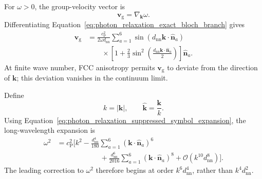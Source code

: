 For \(\omega>0\), the group-velocity vector is
\begin{equation}
    \mathbf v_{\mathrm g}
    =
    \nabla_{\mathbf k}\omega.
    \label{eq:photon_relaxation_group_velocity_definition}
\end{equation}
Differentiating
Equation~\eqref{eq:photon_relaxation_exact_bloch_branch} gives
\begin{align}
    \mathbf v_{\mathrm g}
    &=
    \frac{
        c_{\mathrm P}^2
    }{
        2\omega d_{\mathrm{nn}}
    }
    \sum_{a=1}^{6}
    \sin
    \left(
        d_{\mathrm{nn}}
        \mathbf k\cdot
        \widehat{\mathbf n}_a
    \right)
    \nonumber\\
    &\qquad\times
    \left[
        1
        +
        \frac{2}{3}
        \sin^2
        \left(
            \frac{
                d_{\mathrm{nn}}
                \mathbf k\cdot
                \widehat{\mathbf n}_a
            }{
                2
            }
        \right)
    \right]
    \widehat{\mathbf n}_a.
    \label{eq:photon_relaxation_exact_group_velocity_vector}
\end{align}
At finite wave number, FCC anisotropy permits
\(\mathbf v_{\mathrm g}\) to deviate from the direction of
\(\mathbf k\); this deviation vanishes in the continuum limit.

Define
\begin{equation}
    k
    =
    \left|
        \mathbf k
    \right|,
    \qquad
    \widehat{\mathbf k}
    =
    \frac{
        \mathbf k
    }{
        k
    }.
    \label{eq:photon_relaxation_wavevector_direction}
\end{equation}
Using
Equation~\eqref{eq:photon_relaxation_suppressed_symbol_expansion}, the
long-wavelength expansion is
\begin{align}
    \omega^2
    &=
    c_{\mathrm P}^2
    \Bigg[
        k^2
        -
        \frac{
            d_{\mathrm{nn}}^4
        }{
            180
        }
        \sum_{a=1}^{6}
        \left(
            \mathbf k\cdot
            \widehat{\mathbf n}_a
        \right)^6
    \nonumber\\
    &\hspace{6em}
        +
        \frac{
            d_{\mathrm{nn}}^6
        }{
            2016
        }
        \sum_{a=1}^{6}
        \left(
            \mathbf k\cdot
            \widehat{\mathbf n}_a
        \right)^8
        +
        \mathcal O
        \left(
            k^{10}d_{\mathrm{nn}}^8
        \right)
    \Bigg].
    \label{eq:photon_relaxation_exact_branch_expansion}
\end{align}
The leading correction to \(\omega^2\) therefore begins at order
\(k^6d_{\mathrm{nn}}^4\), rather than
\(k^4d_{\mathrm{nn}}^2\).

